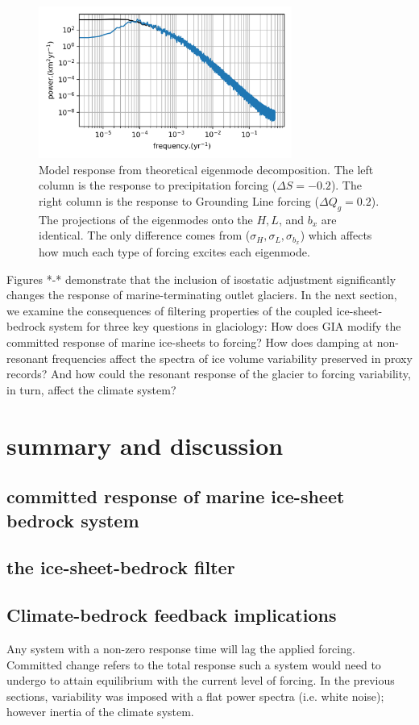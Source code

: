 \documentclass[tc, manuscript]{copernicus}
\begin{document}
\begin{figure}[t]
\includegraphics[width=8.3cm]{../figures/simulationSMB03.png}
\caption{Model response from theoretical eigenmode decomposition.
The left column is the response to precipitation forcing ($\Delta S = −0.2$). 
The right column is the response to Grounding Line forcing ($\Delta Q_g = 0.2$).
The projections of the eigenmodes onto the $H, L$, and $b_x$ are identical. The only difference comes from ($\sigma_H, \sigma_L, \sigma_{b_x}$) which affects how much each type of forcing excites each eigenmode.}
\end{figure}


Figures *-* demonstrate that the inclusion of isostatic adjustment significantly changes the response of marine-terminating outlet glaciers. 
In the next section, we examine the consequences of filtering properties of the coupled ice-sheet-bedrock system for three key questions in glaciology: 
How does GIA modify the committed response of marine ice-sheets to forcing?
How does damping at non-resonant frequencies affect the spectra of ice volume variability preserved in proxy records?
And how could the resonant response of the glacier to forcing variability, in turn, affect the climate system?

\section{summary and discussion}
\subsection{committed response of marine ice-sheet bedrock system}

\subsection{the ice-sheet-bedrock filter}

\subsection{Climate-bedrock feedback implications}
Any system with a non-zero response time will lag the applied forcing.
Committed change refers to the total response such a system would need to undergo to attain equilibrium with the current level of forcing.
In the previous sections, variability was imposed with a flat power spectra (i.e. white noise); however inertia of the climate system.
\end{document}
